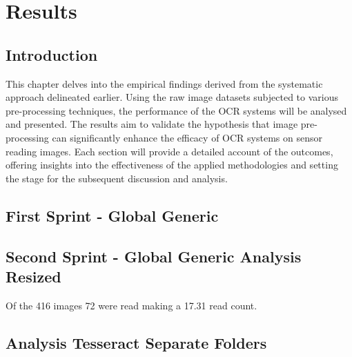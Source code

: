 \chapter{Results}
\label{chap:results}

\section{Introduction}

This chapter delves into the empirical findings derived from the systematic approach delineated earlier. Using the raw image datasets subjected to various pre-processing techniques, the performance of the OCR systems will be analysed and presented. The results aim to validate the hypothesis that image pre-processing can significantly enhance the efficacy of OCR systems on sensor reading images. Each section will provide a detailed account of the outcomes, offering insights into the effectiveness of the applied methodologies and setting the stage for the subsequent discussion and analysis.

\section{First Sprint - Global Generic}
\section{Second Sprint - Global Generic Analysis Resized}

Of the 416 images 72 were read making a 17.31 read count.

\newpage

\section{Analysis Tesseract Separate Folders}

